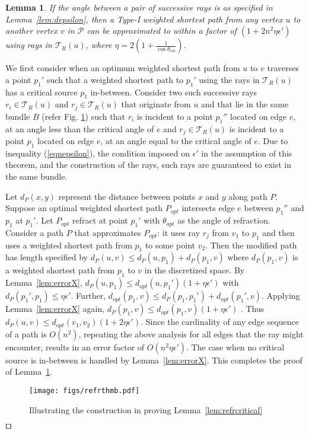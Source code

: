 \documentclass[11pt]{article}
\def\qed{\hbox{\rlap{$\sqcap$}$\sqcup$}}
\def\calP{\mathcal{P}}
\def\calT{\mathcal{T}}
\newtheorem{lemma}{Lemma}[section]
\newenvironment{proof}{\par\noindent{\bf Proof:}}{\mbox{}\hfill$\qed$\\}
\begin{document}
\begin{lemma}
\label{lem:refrnoncritical}
If the angle between a pair of successive rays is as specified in Lemma~\ref{lem:depsilon}, then a Type-I weighted shortest path from any vertex $u$ to another vertex $v$ in $\calP$ can be approximated to within a factor of $(1+ 2n^2 \eta \epsilon')$ using rays in $\calT_R(u)$, where $\eta= 2(1+ \frac{1}{\cos{\theta_{cm}}})$.
\end{lemma}
\begin{proof}
We first consider when an optimum weighted shortest path from $u$ to $v$ traverses a point $p_1'$ such that a weighted shortest path to $p_1'$ using the rays in ${\calT}_R(u)$ has a critical source $p_1$ in-between.
Consider two such successive rays $r_i \in \calT_R(u)$ and $r_j \in \calT_R(u)$ that originate from $u$ and that lie
in the same bundle $B$ (refer Fig. \ref{fig:refrthmb}) such that
 $r_i $ is incident to a point $p_1''$ located on edge $e$, at an angle less than the critical angle of $e$
and $r_j \in \calT_R(u)$  is incident to a point $p_1$ located on edge $e$, at an angle equal to the critical angle of $e$.  
Due to inequality (\ref{eqnepsilon}), the condition imposed on $\epsilon'$ in the assumption of this theorem, and the construction of the rays, such rays are guaranteed to exist in the same bundle.

Let $d_{P}(x, y)$ represent the distance between points $x$ and $y$ along path $P$. 
Suppose an optimal weighted shortest path $P_{opt}$ intersects edge $e$ between $p_1''$ and $p_1$ at $p_1'$.
Let $P_{opt}$ refract at point $p_1'$ with $\theta_{opt}$ as the angle of refraction. 
Consider a path $P$ that approximates $P_{opt}$: it uses ray $r_j$ from $v_1$ to $p_1$ and then uses a weighted shortest path from $p_1$ to some point $v_2$. Then the modified path has length specified by $d_{P}(u, v) \leq d_{P}(u, p_1)+d_{P}(p_1, v)$ where $d_{P}(p_1,v)$ is a weighted shortest path from $p_1$ to $v$ in the discretized space.
By Lemma~\ref{lem:errorX},
$d_{P}(u, p_1) \le d_{opt}(u, p_1') (1+ \eta \epsilon' )$
with $d_P(p_1',p_1) \leq \eta \epsilon'$.
Further, $d_{opt}(p_1, v) \le d_{P}(p_1,p_1') + d_{opt}(p_1',v)$.
Applying  Lemma~\ref{lem:errorX} again, 
$d_{P}(p_1,v) \leq d_{opt}(p_1,v)(1+ \eta \epsilon')$ .
Thus $d_{P}(u,v) \leq  d_{opt}(v_1,v_2)(1+ 2\eta \epsilon')$.
Since the cardinality of any edge sequence of a path is  $O(n^2)$,
repeating the above analysis for all edges that the ray might encounter,
results in an error factor of $O(n^2 \eta \epsilon') $.
The case when no critical source is in-between is handled by  Lemma~\ref{lem:errorX}.
This completes the proof of Lemma~\ref{lem:refrnoncritical}.
\begin{figure}[h]
\begin{minipage}[t]{\linewidth}
\begin{center}
\texttt{[image: figs/refrthmb.pdf]}
\caption{\footnotesize Illustrating the construction in proving Lemma~\ref{lem:refrcritical} }
\label{fig:refrthmb}
\end{center}
\end{minipage}
\vspace*{-0.1in}
\end{figure}
\end{proof}
\end{document}

